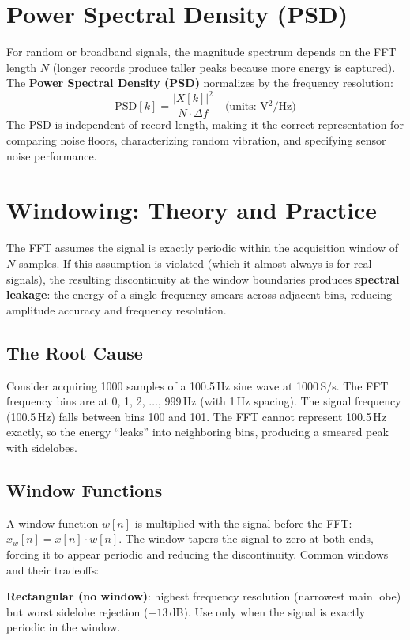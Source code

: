\documentclass[11pt,letterpaper,twoside,openany]{book}
\begin{document}
\section{Power Spectral Density (PSD)}
For random or broadband signals, the magnitude spectrum depends on the FFT length $N$ (longer records produce taller peaks because more energy is captured). The \textbf{Power Spectral Density (PSD)} normalizes by the frequency resolution:
\begin{equation}
\text{PSD}[k] = \frac{|X[k]|^2}{N \cdot \Delta f} \quad \text{(units: V$^2$/Hz)}
\end{equation}
The PSD is independent of record length, making it the correct representation for comparing noise floors, characterizing random vibration, and specifying sensor noise performance.

\section{Windowing: Theory and Practice}
The FFT assumes the signal is exactly periodic within the acquisition window of $N$ samples. If this assumption is violated (which it almost always is for real signals), the resulting discontinuity at the window boundaries produces \textbf{spectral leakage}: the energy of a single frequency smears across adjacent bins, reducing amplitude accuracy and frequency resolution.

\subsection{The Root Cause}
Consider acquiring 1000 samples of a 100.5\,Hz sine wave at 1000\,S/s. The FFT frequency bins are at 0, 1, 2, $\ldots$, 999\,Hz (with 1\,Hz spacing). The signal frequency (100.5\,Hz) falls between bins 100 and 101. The FFT cannot represent 100.5\,Hz exactly, so the energy ``leaks'' into neighboring bins, producing a smeared peak with sidelobes.

\subsection{Window Functions}
A window function $w[n]$ is multiplied with the signal before the FFT: $x_w[n] = x[n] \cdot w[n]$. The window tapers the signal to zero at both ends, forcing it to appear periodic and reducing the discontinuity. Common windows and their tradeoffs:

\textbf{Rectangular (no window)}: highest frequency resolution (narrowest main lobe) but worst sidelobe rejection ($-13$\,dB). Use only when the signal is exactly periodic in the window.
\end{document}
